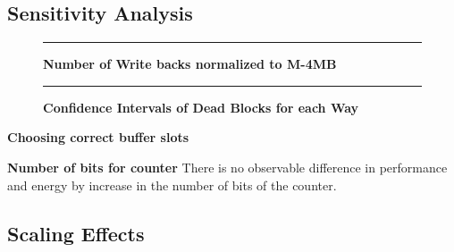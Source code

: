 \subsection{Sensitivity Analysis}

\begin{figure*} [t]
\centering
 \hrule
 \caption{\label{fig:writebacks} \scriptsize \bf Number of Write backs normalized to M-4MB}
\end{figure*}


\begin{figure*} [t]
\centering
 \hrule
 \caption{\label{fig:confi} \scriptsize \bf Confidence Intervals of Dead Blocks for each Way}
\end{figure*}

\noindent\textbf {Choosing correct buffer slots}

\noindent\textbf {Number of bits for counter}
There is no observable difference in performance and energy by increase in the number of bits of the counter. 
\subsection{Scaling Effects}







